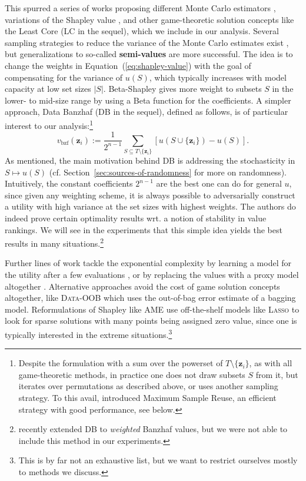 \documentclass[10pt]{article}
\newcommand{\assign}{:=}
\newcommand{\tmdfn}[1]{\textbf{#1}}
\newcommand{\tmem}[1]{{\em #1\/}}
\newcommand{\tmmathbf}[1]{\ensuremath{\boldsymbol{#1}}}
\newcommand{\tmname}[1]{\textsc{#1}}
\newcommand{\tmop}[1]{\ensuremath{\operatorname{#1}}}
\begin{document}
This spurred a series of works proposing different Monte Carlo estimators
{\citep{okhrati_multilinear_2021}}, variations of the Shapley value
{\citep{kwon_efficient_2021}}, and other game-theoretic solution concepts
like the Least Core {\citep{yan_if_2021,benmerzoug_re_2023}} (LC in the
sequel), which we include in our analysis. Several sampling strategies to
reduce the variance of the Monte Carlo estimates exist
{\citep{wu_variance_2023,covert_stochastic_2024}}, but generalizations to
so-called {\tmdfn{semi-values}} are more successful. The idea is to change the
weights in  Equation~(\ref{eq:shapley-value}) with the goal of compensating
for the variance of $u (S)$, which typically increases with model capacity at
low set sizes $|S|$. Beta-Shapley {\citep{kwon_beta_2022}} gives more weight
to subsets $S$ in the lower- to mid-size range by using a Beta function for
the coefficients. A simpler approach, Data Banzhaf {\citep{wang_data_2022}}
(DB in the sequel), defined as follows, is of particular interest to our
analysis:\footnote{Despite the formulation with a sum over the powerset of $T
\setminus \{\tmmathbf{z}_i \}$, as with all game-theoretic methods, in
practice one does not draw subsets $S$ from it, but iterates over permutations
as described above, or uses another sampling strategy. To this avail,
{\cite{wang_data_2022}} introduced Maximum Sample Reuse, an efficient
strategy with good performance, see below.}
\begin{equation}
  v_{\tmop{bzf}} (\tmmathbf{z}_i) \assign \frac{1}{2^{n - 1}}  \sum_{S
  \subseteq T \setminus \{\tmmathbf{z}_i \}} [u (S \cup \{\tmmathbf{z}_i \}) -
  u (S)] . \label{eq:banzhaf-value}
\end{equation}
As mentioned, the main motivation behind DB is addressing the stochasticity in
$S \mapsto u (S)$ (cf.  Section~\ref{sec:sources-of-randomness} for more on
randomness). Intuitively, the constant coefficients $2^{n - 1}$ are the best
one can do for general $u$, since given any weighting scheme, it is always
possible to adversarially construct a utility with high variance at the set
sizes with highest weights. The authors do indeed prove certain optimality
results wrt. a notion of stability in value rankings. We will see in the
experiments that this simple idea yields the best results in many
situations.\footnote{{\citep{li_robust_2023}} recently extended DB to
{\tmem{weighted}} Banzhaf values, but we were not able to include this method
in our experiments.}

Further lines of work tackle the exponential complexity by learning a model
for the utility after a few evaluations {\citep{wang_improving_2022}}, or by
replacing the values with a proxy model altogether
{\cite{jia_scalability_2021}}. Alternative approaches avoid the cost of game
solution concepts altogether, like {\tmname{Data-OOB}}
{\cite{kwon_dataoob_2023}} which uses the out-of-bag error estimate of a
bagging model. Reformulations of Shapley like AME {\cite{lin_measuring_2022}}
use off-the-shelf models like {\tmname{Lasso}} to look for sparse solutions
with many points being assigned zero value, since one is typically interested
in the extreme situations.\footnote{This is by far not an exhaustive list, but
we want to restrict ourselves mostly to methods we discuss.}
\end{document}
